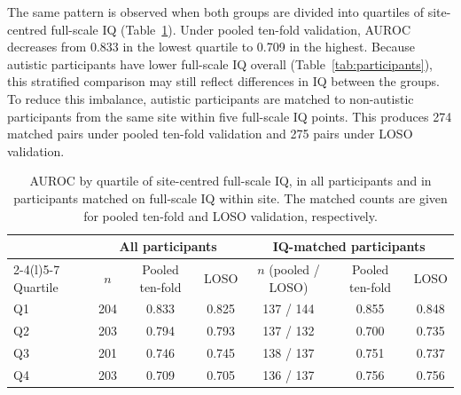 The same pattern is observed when both groups are divided into quartiles of site-centred full-scale IQ (Table~\ref{tab:iq-quartiles}). Under pooled ten-fold validation, AUROC decreases from 0.833 in the lowest quartile to 0.709 in the highest. Because autistic participants have lower full-scale IQ overall (Table~\ref{tab:participants}), this stratified comparison may still reflect differences in IQ between the groups. To reduce this imbalance, autistic participants are matched to non-autistic participants from the same site within five full-scale IQ points. This produces 274 matched pairs under pooled ten-fold validation and 275 pairs under LOSO validation.

\begin{table}[t]
\centering
\caption{AUROC by quartile of site-centred full-scale IQ, in all participants and in
participants matched on full-scale IQ within site. The matched counts are given for pooled
ten-fold and LOSO validation, respectively.}
\label{tab:iq-quartiles}
\small
\begin{tabular}{@{}lcccccc@{}}
\toprule
 & \multicolumn{3}{c}{All participants} & \multicolumn{3}{c}{IQ-matched participants} \\
\cmidrule(lr){2-4}\cmidrule(l){5-7}
Quartile & $n$ & Pooled ten-fold & LOSO & $n$ (pooled / LOSO) & Pooled ten-fold & LOSO \\
\midrule
Q1 & 204 & 0.833 & 0.825 & 137 / 144 & 0.855 & 0.848 \\
Q2 & 203 & 0.794 & 0.793 & 137 / 132 & 0.700 & 0.735 \\
Q3 & 201 & 0.746 & 0.745 & 138 / 137 & 0.751 & 0.737 \\
Q4 & 203 & 0.709 & 0.705 & 136 / 137 & 0.756 & 0.756 \\
\bottomrule
\end{tabular}
\end{table}

